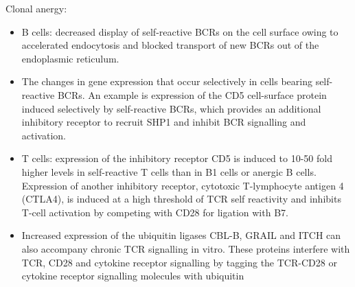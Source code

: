 \documentclass{report}
\begin{document}
Clonal anergy: 
\begin{itemize}
	\item B cells: decreased display of self-reactive BCRs on the cell surface owing to accelerated endocytosis and blocked transport of new BCRs out of the endoplasmic reticulum. 

	\item The changes in gene expression that occur selectively in cells bearing self-reactive BCRs. An example is expression of the CD5 cell-surface protein induced selectively by self-reactive BCRs, which provides an additional inhibitory receptor to recruit SHP1 and inhibit BCR signalling and activation. 

	\item T cells: expression of the inhibitory receptor CD5 is induced to 10-50 fold higher levels in self-reactive T cells than in B1 cells or anergic B cells. Expression of another inhibitory receptor, cytotoxic T-lymphocyte antigen 4 (CTLA4), is induced at a high threshold of TCR self reactivity and inhibits T-cell activation by competing with CD28 for ligation with B7. 

	\item Increased expression of the ubiquitin ligases CBL-B, GRAIL and ITCH can also accompany chronic TCR signalling in vitro. These proteins interfere with TCR, CD28 and cytokine receptor signalling by tagging the TCR-CD28 or cytokine receptor signalling molecules with ubiquitin
\end{itemize}
\end{document}
